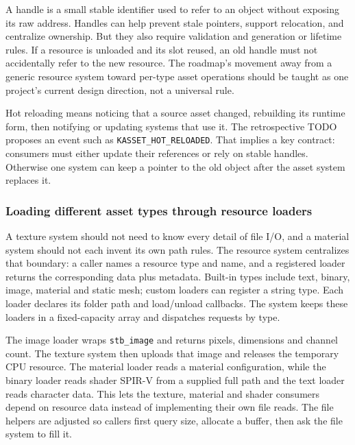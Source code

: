 A handle is a small stable identifier used to refer to an object without exposing its raw address. Handles can help prevent stale pointers, support relocation, and centralize ownership. But they also require validation and generation or lifetime rules. If a resource is unloaded and its slot reused, an old handle must not accidentally refer to the new resource. The roadmap's movement away from a generic resource system toward per-type asset operations should be taught as one project's current design direction, not a universal rule.

Hot reloading means noticing that a source asset changed, rebuilding its runtime form, then notifying or updating systems that use it. The retrospective TODO proposes an event such as \texttt{KASSET\_HOT\_RELOADED}. That implies a key contract: consumers must either update their references or rely on stable handles. Otherwise one system can keep a pointer to the old object after the asset system replaces it.

\subsubsection{Loading different asset types through resource loaders}\label{06-engine-ii-ch027-loading-different-asset-types-through-resource-loaders}

A texture system should not need to know every detail of file I/O, and a material system should not each invent its own path rules. The resource system centralizes that boundary: a caller names a resource type and name, and a registered loader returns the corresponding data plus metadata. Built-in types include text, binary, image, material and static mesh; custom loaders can register a string type. Each loader declares its folder path and load/unload callbacks. The system keeps these loaders in a fixed-capacity array and dispatches requests by type.

The image loader wraps \texttt{stb\_image} and returns pixels, dimensions and channel count. The texture system then uploads that image and releases the temporary CPU resource. The material loader reads a material configuration, while the binary loader reads shader SPIR-V from a supplied full path and the text loader reads character data. This lets the texture, material and shader consumers depend on resource data instead of implementing their own file reads. The file helpers are adjusted so callers first query size, allocate a buffer, then ask the file system to fill it.

